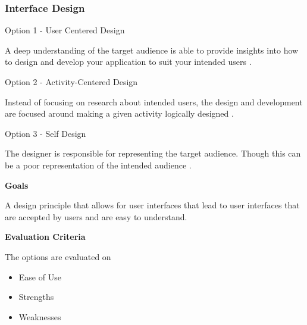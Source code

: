 \documentclass[letterpaper, 10pt, draftclsnofoot, compsoc, onecolumn]{IEEEtran}
\begin{document}
{\newpage
\subsubsection{Interface Design}
{\noindent Option 1 - User Centered Design \par}
{\noindent A deep understanding of the target audience is able to provide insights into how to design and develop your application to suit your intended users \cite{Usability}. \par}

\medskip
{\noindent Option 2 - Activity-Centered Design  \par}
{\noindent Instead of focusing on research about intended users, the design and development are focused around making a given activity logically designed \cite{AListApart}. \par}

\medskip
{\noindent Option 3 - Self Design \par}
{\noindent The designer is responsible for representing the target audience. Though this can be a poor representation of the intended audience \cite{AListApart}.\par}

\medskip
{\noindent\rmfamily\bfseries\color{black} Goals \par}
{\noindent A design principle that allows for user interfaces that lead to user interfaces that are accepted by users and are easy to understand.\par}

\medskip
{\noindent\rmfamily\bfseries\color{black} Evaluation Criteria \par}
{\noindent The options are evaluated on 

\begin{itemize}
\item Ease of Use
\item Strengths
\item Weaknesses

\end{itemize}

\par}

\vspace{2pc}

}
\end{document}
